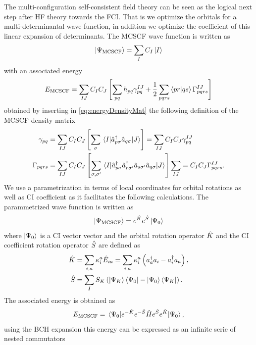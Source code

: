 \documentclass[11pt,a4paper]{article}
\newcommand{\hH}{\Hat{H}} %
\newcommand{\hE}{\Hat{E}} %
\newcommand{\hK}{\Hat{K}} %
\newcommand{\hS}{\Hat{S}}
\newcommand{\cre}[1]{a_{#1}^\dagger} %
\newcommand{\ani}[1]{a_{#1}} %
\newcommand{\MCSCF}{\text{MCSCF}}
\begin{document}
The multi-configuration self-consistent field theory can be seen as the logical next step after HF theory towards the FCI.
That is we optimize the orbitals for a multi-determinantal wave function, in addition we optimize the coefficient of this linear expansion of determinants.
The MCSCF wave function is written as
\begin{equation}
  \label{eq:MCSCF_WF}
  \ket{\Psi_{\text{MCSCF}}}=\sum_I C_I \ket{I}
\end{equation}
with an associated energy
\begin{equation}
  \label{eq:MCSCF_NRJ_RDM}
  E_{\MCSCF} = \sum_{IJ}C_IC_J\left[\sum_{pq}h_{pq} \gamma_{pq}^{IJ} + \frac{1}{2}\sum_{pqrs} \braket{pr}{qs} \Gamma_{pqrs}^{IJ}\right]
\end{equation}
obtained by inserting in \eqref{eq:energyDensityMat} the following definition of the MCSCF density matrix
\begin{align}
  \label{eq:MCSCF_1RDM}
  \gamma_{pq}&=\sum_{IJ}C_IC_J\left[\sum_\sigma\mel{I}{\hat{a}_{p\sigma}^\dagger \hat{a}_{q\sigma}}{J}\right]=\sum_{IJ}C_IC_J\gamma_{pq}^{IJ}\\
  \label{eq:MCSCF_2RDM}
  \Gamma_{pqrs}&=\sum_{IJ}C_IC_J\left[\sum_{\sigma,\sigma'}\mel{I}{\hat{a}_{p\sigma}^\dagger\hat{a}_{r\sigma'}^\dagger\hat{a}_{s\sigma'}\hat{a}_{q\sigma}}{J}\right]\sum_{IJ}=C_IC_J\Gamma_{pqrs}^{IJ}.
\end{align}
We use a parametrization in terms of local coordinates for orbital rotations as well as CI coefficient as it facilitates the following calculations. The parammetrized wave function is written as
\begin{equation}
  \label{eq:MCSCF_WF_localCoord}
  \ket{\Psi_{\text{MCSCF}}}=e^{\hK}e^{\hS}\ket{\Psi_0}
\end{equation}
where $\ket{\Psi_0}$ is a CI vector vector and the orbital rotation operator $\hK$ and the CI coefficient rotation operator $\hS$ are defined as
\begin{align}
  \hK &= \sum_{i,a} \kappa_i^a \hE_{ia} = \sum_{i,a} \kappa_i^a \left( \cre{a}\ani{i} - \cre{i}\ani{a} \right),  \\
  \hS &= \sum_I S_{K}\left(\ket{\Psi_K}\bra{\Psi_0}-\ket{\Psi_0}\bra{\Psi_K}\right).
\end{align}
The associated energy is obtained as
\begin{equation}
  \label{eq:MCSCF_NRJ_Exp}
  E_{\text{MCSCF}} = \mel{\Psi_0}{e^{-\hK}e^{-\hS} \hH e^{\hS}e^{\hK}}{\Psi_0},
\end{equation}
using the BCH expansion this energy can be expressed as an infinite serie of nested commutators
\end{document}

